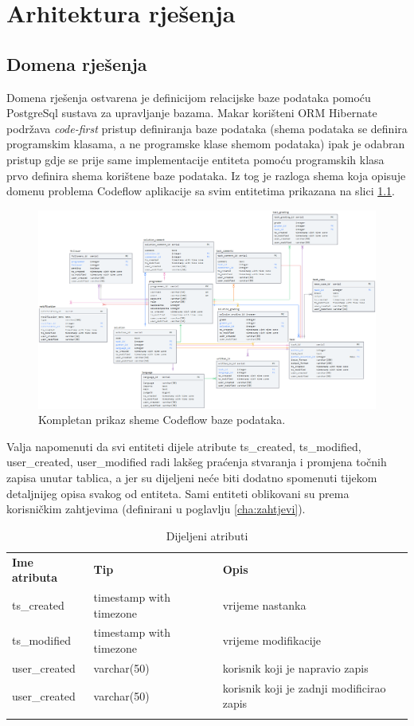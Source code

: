 \documentclass[times, utf8, zavrsni]{fer}
\begin{document}
	\chapter{Arhitektura rješenja}
		\section{Domena rješenja}
		\label{sec:domenarjesenja}
		Domena rješenja ostvarena je definicijom relacijske baze podataka pomoću PostgreSql sustava za upravljanje bazama. Makar korišteni ORM Hibernate podržava \textit{code-first} pristup definiranja baze podataka (shema podataka se definira programskim klasama, a ne programske klase shemom podataka) ipak je odabran pristup gdje se prije same implementacije entiteta pomoću programskih klasa prvo definira shema korištene baze podataka. Iz tog je razloga shema koja opisuje domenu problema Codeflow aplikacije sa svim entitetima prikazana na slici \ref{fig:db}.
		\begin{figure}[H]
			\centering
			\includegraphics[width=\linewidth]{pictures/prikazi/Database.png}
			\caption{Kompletan prikaz sheme Codeflow baze podataka.}
			\label{fig:db}
		\end{figure}
		Valja napomenuti da svi entiteti dijele atribute ts\_created, ts\_modified, user\_created, user\_modified radi lakšeg praćenja stvaranja i promjena točnih zapisa unutar tablica, a jer su dijeljeni neće biti dodatno spomenuti tijekom detaljnijeg opisa svakog od entiteta. Sami entiteti oblikovani su prema korisničkim zahtjevima (definirani u poglavlju \ref{cha:zahtjevi}).
		\begin{table}[H]
			\caption{Dijeljeni atributi}
			\label{tbl:dij-attr}
			\centering
			\begin{tabu} to \textwidth {XXX}
				\tabucline[1.75pt]{-}
				\textbf{Ime atributa} & \textbf{Tip} & \textbf{Opis}\\				
				\tabucline[1.75pt]{-}
				ts\_created & timestamp with timezone & vrijeme nastanka\\ \hline
				ts\_modified & timestamp with timezone & vrijeme modifikacije\\ \hline
				user\_created & varchar(50) & korisnik koji je napravio zapis\\ \hline
				user\_created & varchar(50) & korisnik koji je zadnji modificirao zapis\\
				\tabucline[1.75pt]{-}
			\end{tabu}
		\end{table}
		
\end{document}
